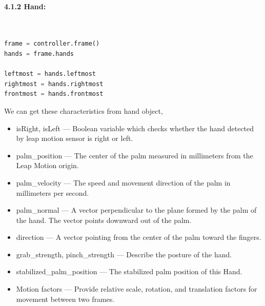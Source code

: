 \documentclass[11pt,a4paper]{article}
\newcommand\tab[1][1cm]{\hspace*{#1}}
\begin{document}
    \tab{In on\_frame method from controller object, we can get the current frame. It also supports serialization.}\\

    \vspace{3cm}
    \textbf{\Large{4.1.2 Hand:}}
	\vspace{0.5cm}\\
	\tab{Hands are the main entity tracked by the Leap Motion controller. The Hand class represents a physical hand detected by the Leap. A Hand object provides access to lists of its pointables as well as attributes describing the hand position, orientation, and movement.}\\
	\tab{From current frame object, we can get the current set of detected hand as an array. We can get hand from hands object by these properties,}\\
	\begin{lstlisting}[language=Python, caption=getting frame and hand object]
frame = controller.frame() 
hands = frame.hands

leftmost = hands.leftmost
rightmost = hands.rightmost
frontmost = hands.frontmost\end{lstlisting}
\vspace{0.5cm}
    We can get these characteristics from hand object,
    \begin{itemize}
        \item isRight, isLeft — Boolean variable which checks whether the hand detected by leap motion sensor is right or left.
        \item palm\_position — The center of the palm measured in millimeters from the Leap Motion origin.
        \item palm\_velocity — The speed and movement direction of the palm in millimeters per second.
        \item palm\_normal — A vector perpendicular to the plane formed by the palm of the hand. The vector points downward out of the palm.
        \item direction — A vector pointing from the center of the palm toward the fingers.
        \item grab\_strength, pinch\_strength — Describe the posture of the hand.
        \item stabilized\_palm\_position — The stabilized palm position of this Hand.
        \item Motion factors — Provide relative scale, rotation, and translation factors for movement between two frames.
    \end{itemize}
\end{document}
